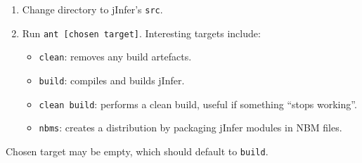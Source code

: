\documentclass[a4paper,10pt,oneside]{article}
\begin{document}
\begin{enumerate}\item 
 Change directory to jInfer's \texttt{src}.
  \item Run \texttt{ant [chosen target]}. Interesting targets include:
    \begin{itemize}\item 
        \texttt{clean}: removes any build artefacts.
      \item \texttt{build}: compiles and builds jInfer.
      \item \texttt{clean build}: performs a clean build, useful if something ``stops working''.
      \item \texttt{nbms}: creates a distribution by packaging jInfer modules in NBM files.
      \end{itemize}
  \end{enumerate}\par Chosen target may be empty, which should default to \texttt{build}.
 

 
\end{document}
